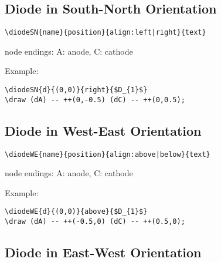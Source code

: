 \documentclass[parskip=full]{scrartcl}
\begin{document}
\subsection{Diode in South-North Orientation}

\begin{verbatim}
\diodeSN{name}{position}{align:left|right}{text}
\end{verbatim}
node endings: A: anode, C: cathode

Example:\\
\begin{minipage}{0.8\textwidth}
\begin{verbatim}
\diodeSN{d}{(0,0)}{right}{$D_{1}$}
\draw (dA) -- ++(0,-0.5) (dC) -- ++(0,0.5);
\end{verbatim}
\end{minipage}
\begin{minipage}{0.19\textwidth}
\end{minipage}

\subsection{Diode in West-East Orientation}

\begin{verbatim}
\diodeWE{name}{position}{align:above|below}{text}
\end{verbatim}
node endings: A: anode, C: cathode

Example:\\
\begin{minipage}{0.8\textwidth}
\begin{verbatim}
\diodeWE{d}{(0,0)}{above}{$D_{1}$}
\draw (dA) -- ++(-0.5,0) (dC) -- ++(0.5,0);
\end{verbatim}
\end{minipage}
\begin{minipage}{0.19\textwidth}
\end{minipage}

\subsection{Diode in East-West Orientation}
\end{document}
